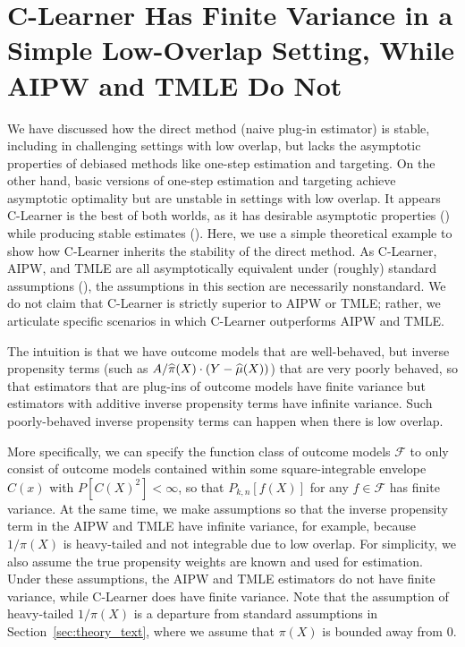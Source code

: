 \section{C-Learner Has Finite Variance in a Simple Low-Overlap Setting, While AIPW and TMLE Do Not}
\label{sec:theory_simple}
We have discussed how the direct method (naive plug-in estimator) is stable, including in challenging settings with low overlap, but lacks the asymptotic properties of debiased methods like one-step estimation and targeting. On the other hand, basic versions of one-step estimation and targeting achieve asymptotic optimality but are unstable in settings with low overlap. It appears C-Learner is the best of both worlds, as it has desirable asymptotic properties () while producing stable estimates (). 
Here, we use a simple theoretical example to show how C-Learner inherits the stability of the direct method. 
As C-Learner, AIPW, and TMLE are all asymptotically equivalent under (roughly) standard assumptions (), the assumptions in this section are necessarily nonstandard. 
We do not claim that C-Learner is strictly superior to AIPW or TMLE; rather, we articulate specific scenarios in which C-Learner outperforms AIPW and TMLE. 


The intuition is that we have outcome models that are well-behaved, but inverse propensity terms (such as $A/\widehat{\pi}(X)\cdot (Y-\widehat{\mu}(X))$) that are very poorly behaved, so that estimators that are plug-ins of outcome models have finite variance but estimators with additive inverse propensity terms have infinite variance. Such poorly-behaved inverse propensity terms can happen when there is low overlap. 


More specifically, we can specify the function class of outcome models $\mathcal F$ to only consist of outcome models contained within some square-integrable envelope $C(x)$ with $P[C(X)^2]<\infty$, so that $P_{k,n}[f(X)]$ for any $f\in \mathcal F$ has finite variance. 
At the same time, we make assumptions so that the inverse propensity term in the AIPW and TMLE have infinite variance, for example, because $1/\pi(X)$ is heavy-tailed and not integrable due to low overlap. 
For simplicity, we also assume the true propensity weights are known and used for estimation. 
Under these assumptions, the AIPW and TMLE estimators do not have finite variance, while C-Learner does have finite variance. 
Note that the assumption of heavy-tailed $1/\pi(X)$ is a departure from standard assumptions in Section~\ref{sec:theory_text}, where we assume that $\pi(X)$ is bounded away from 0. 




